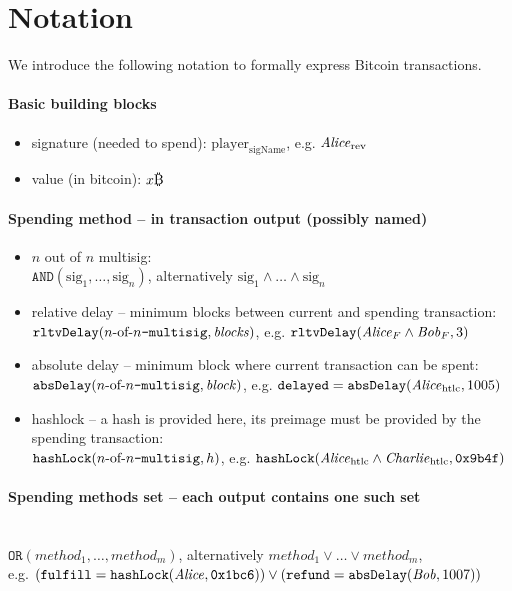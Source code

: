 \section{Notation}
  We introduce the following notation to formally express Bitcoin transactions.

  \paragraph{Basic building blocks}
    \begin{itemize}
      \item signature (needed to spend): $\mathrm{player}_{\mathrm{sigName}}$,
      e.g. $\mathit{Alice}_{\mathrm{rev}}$
      \item value (in bitcoin): $x\bitcoin$
    \end{itemize}

  \paragraph{Spending method -- in transaction output (possibly named)}
    \begin{itemize}
      \item $n$ out of $n$ multisig: \\
      $\mathtt{AND}(\mathrm{sig}_1, \dots, \mathrm{sig}_n)$, alternatively
      $\mathrm{sig}_1 \wedge \dots \wedge \mathrm{sig}_n$
      \item relative delay -- minimum blocks between current and spending
      transaction: \\
      $\mathtt{rltvDelay}(n\text{-of-}n\text{\tt -multisig}, \mathit{blocks})$, e.g. $\mathtt{rltvDelay}(\mathit{Alice}_{F} \wedge \mathit{Bob}_{F},
      3)$
      \item absolute delay -- minimum block where current transaction can be
      spent: \\
      $\mathtt{absDelay}(n\text{-of-}n\text{\tt -multisig}, \mathit{block})$, e.g. $\mathtt{delayed} =
      \mathtt{absDelay}(\mathit{Alice}_{\mathrm{htlc}}, 1005)$
      \item hashlock -- a hash is provided here, its preimage must be provided
      by the spending transaction: \\
      $\mathtt{hashLock}(n\text{-of-}n\text{\tt -multisig}, h)$, e.g. $\mathtt{hashLock}(\mathit{Alice}_{\mathrm{htlc}} \wedge
      \mathit{Charlie}_{\mathrm{htlc}}, \mathtt{0x9b4f})$
    \end{itemize}

  \paragraph{Spending methods set -- each output contains one such set} \ \\
    $\mathtt{OR}(\mathit{method}_1, \dots, \mathit{method}_m)$,
    alternatively $\mathit{method}_1 \vee \dots \vee \mathit{method}_m$, \\
    e.g. $(\mathtt{fulfill} = \mathtt{hashLock}(\mathit{Alice}, \mathtt{0x1bc6})) \vee
    (\mathtt{refund} = \mathtt{absDelay}(\mathit{Bob}, 1007))$

